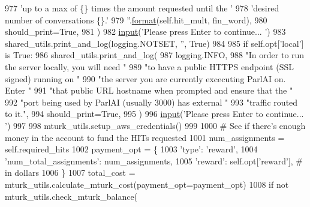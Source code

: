 \begin{DoxyCode}
977                 \textcolor{stringliteral}{'up to a max of \{\} times the amount requested until the '}
978                 \textcolor{stringliteral}{'desired number of conversations \{\}.'}
979                 \textcolor{stringliteral}{''}.\hyperlink{namespaceparlai_1_1chat__service_1_1services_1_1messenger_1_1shared__utils_a32e2e2022b824fbaf80c747160b52a76}{format}(self.hit\_mult, fin\_word),
980                 should\_print=\textcolor{keyword}{True},
981             )
982         \hyperlink{namespaceparlai_1_1mturk_1_1core_1_1dev_1_1test_1_1test__full__system_a1e1817cd65688fb90f827834d1fb4567}{input}(\textcolor{stringliteral}{'Please press Enter to continue... '})
983         shared\_utils.print\_and\_log(logging.NOTSET, \textcolor{stringliteral}{''}, \textcolor{keyword}{True})
984 
985         \textcolor{keywordflow}{if} self.opt[\textcolor{stringliteral}{'local'}] \textcolor{keywordflow}{is} \textcolor{keyword}{True}:
986             shared\_utils.print\_and\_log(
987                 logging.INFO,
988                 \textcolor{stringliteral}{"In order to run the server locally, you will need "}
989                 \textcolor{stringliteral}{"to have a public HTTPS endpoint (SSL signed) running on "}
990                 \textcolor{stringliteral}{"the server you are currently excecuting ParlAI on. Enter "}
991                 \textcolor{stringliteral}{"that public URL hostname when prompted and ensure that the "}
992                 \textcolor{stringliteral}{"port being used by ParlAI (usually 3000) has external "}
993                 \textcolor{stringliteral}{"traffic routed to it."},
994                 should\_print=\textcolor{keyword}{True},
995             )
996             \hyperlink{namespaceparlai_1_1mturk_1_1core_1_1dev_1_1test_1_1test__full__system_a1e1817cd65688fb90f827834d1fb4567}{input}(\textcolor{stringliteral}{'Please press Enter to continue... '})
997 
998         mturk\_utils.setup\_aws\_credentials()
999 
1000         \textcolor{comment}{# See if there's enough money in the account to fund the HITs requested}
1001         num\_assignments = self.required\_hits
1002         payment\_opt = \{
1003             \textcolor{stringliteral}{'type'}: \textcolor{stringliteral}{'reward'},
1004             \textcolor{stringliteral}{'num\_total\_assignments'}: num\_assignments,
1005             \textcolor{stringliteral}{'reward'}: self.opt[\textcolor{stringliteral}{'reward'}],  \textcolor{comment}{# in dollars}
1006         \}
1007         total\_cost = mturk\_utils.calculate\_mturk\_cost(payment\_opt=payment\_opt)
1008         \textcolor{keywordflow}{if} \textcolor{keywordflow}{not} mturk\_utils.check\_mturk\_balance(

\end{DoxyCode}
